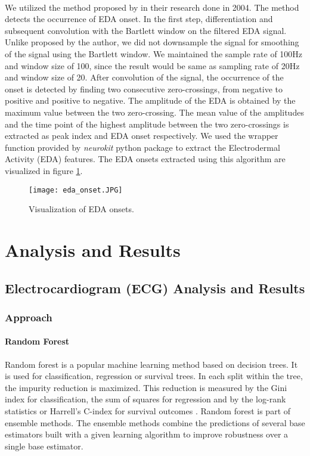 \paragraph{} We utilized the method proposed by \citeauthor{kim_emotion_2004} in their research done in 2004. The method detects the occurrence of EDA onset. In the first step, differentiation and subsequent convolution with the Bartlett window on the filtered EDA signal. Unlike proposed by the author, we did not downsample the signal for smoothing of the signal using the Bartlett window. We maintained the sample rate of 100Hz and window size of 100, since the result would be same as sampling rate of 20Hz and window size of 20. After convolution of the signal, the occurrence of the onset is detected by finding two consecutive zero-crossings, from negative to positive and positive to negative. The amplitude of the EDA is obtained by the maximum value between the two zero-crossing. The mean value of the amplitudes and the time point of the highest amplitude between the two zero-crossings is extracted as peak index and EDA onset respectively. We used the wrapper function provided by \textit{neurokit} python package to extract the Electrodermal Activity (EDA) features. The EDA onsets extracted using this algorithm are visualized in figure \ref{fig:eda_onsets}.

\begin{figure}
    \centering
    \texttt{[image: eda\_onset.JPG]}
    \caption{Visualization of EDA onsets.}
    \label{fig:eda_onsets}
\end{figure}

\section{Analysis and Results}
\subsection{Electrocardiogram (ECG) Analysis and Results}
\subsubsection{Approach}
\paragraph{Random Forest} Random forest \cite{breiman2001random} is a popular machine learning method based on decision trees. It is used for classification, regression or survival trees. In each split within the tree, the impurity reduction is maximized. This reduction is measured by the Gini index for classification, the sum of squares for regression and by the log-rank statistics or Harrell's C-index for survival outcomes \cite{wright_splitting_2019}. Random forest is part of ensemble methods. The ensemble methods combine the predictions of several base estimators built with a given learning algorithm to improve robustness over a single base estimator.
